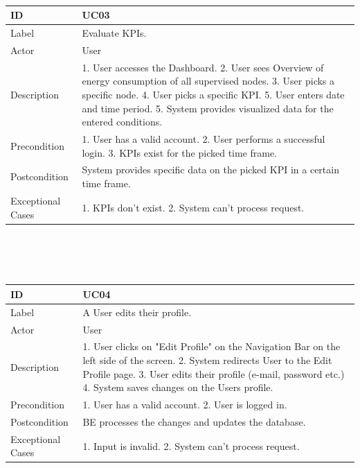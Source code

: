 \documentclass{scrreprt}
\begin{document}
\\
\\ \\ 
\begin{tabularx}{12cm}{l|X}
ID & UC03  \\
\hline
Label & 
Evaluate KPIs. \\
\hline
Actor            & User   \\
\hline
Description            &  	1. User accesses the Dashboard.	
2. User sees Overview of energy consumption of all supervised nodes. 3. User picks a specific node. 4. User picks a specific KPI. 5. User enters date and time period. 5. System provides visualized data for the entered conditions.
\\
\hline
Precondition           & 1. User has a valid account. 2. User performs a successful login. 3. KPIs exist for the picked time frame.  \\
\hline
Postcondition     & System provides specific data on the picked KPI in a certain time frame. \\
\hline
Exceptional Cases & 1. KPIs don't exist. 2. System can't process request.
\end{tabularx}
\\
\\ \\ 
\begin{tabularx}{12cm}{l|X}
ID & UC04  \\
\hline
Label & 
A User edits their profile. \\
\hline
Actor            & User    \\
\hline
Description            &  	1. User clicks on "Edit Profile" on the Navigation Bar on the left side of the screen. 2. System redirects User to the Edit Profile page. 3. User edits their profile (e-mail, password etc.) 4. System saves changes on the Users profile.   
\\
\hline
Precondition           & 1. User has a valid account. 2. User is logged in.  \\
\hline
Postcondition     & BE processes the changes and updates the database. \\
\hline
Exceptional Cases & 1. Input is invalid. 2. System can't process request.
\end{tabularx}
\\
\\ \\
\end{document}
